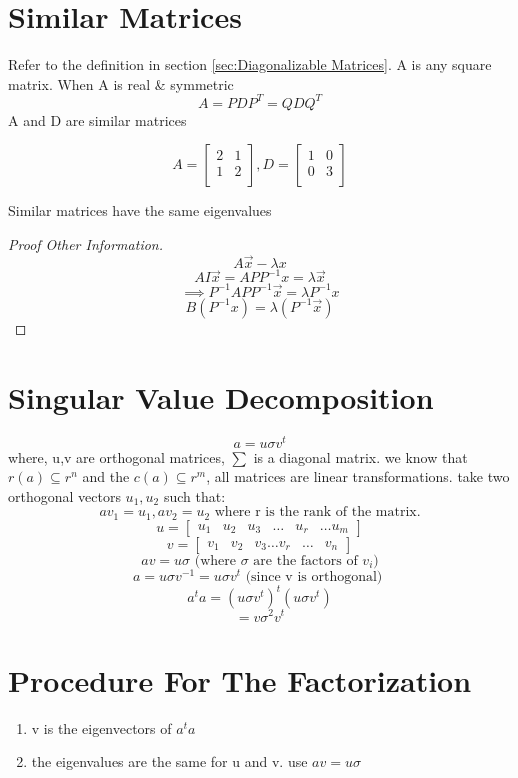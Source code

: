 \documentclass[twoside]{report}
\begin{document}
\section{Similar Matrices}
Refer to the definition in section \ref{sec:Diagonalizable Matrices}.
A is any square matrix. 
When A is real \& symmetric
\[
	A = PDP^T = QDQ^T
\]
A and D are similar matrices
\begin{example}
	\[
		A = 
		\begin{bmatrix}
		   2 & 1 \\
		   1 & 2 \\
		\end{bmatrix},
		 D = 
		\begin{bmatrix}
		   1 & 0 \\
		   0 & 3 \\
		\end{bmatrix}
	\]
\end{example}
\begin{note}
	Similar matrices have the same eigenvalues
\end{note}
\begin{proof}[Proof Other Information]
   \[
   A\vec{x} - \lambda{x}	
   \]
   \[
      AI\vec{x} = APP^{-1}x = \lambda \vec{x}
   \]
   \[
      \implies P^{-1} A P P^{-1} \vec{x} = \lambda P^{-1} x
   \]
   \[
   	B(P^{-1}x) = \lambda(P^{-1}\vec{x})
   \]
   
\end{proof}
\section{Singular Value Decomposition}
\[
   a = u \sigma v^t
     \]
     where, u,v are orthogonal matrices, $\sum$ is a diagonal matrix.
we know that $r(a) \subseteq r^n$ and the $c(a) \subseteq r^m$, all matrices are linear transformations.
take two orthogonal vectors $u_1, u_2$ such that:
\[
   av_1 = u_1, av_2 = u_2 \text{ where r is the rank of the matrix.}
\]
\[
   u = 
   \begin{bmatrix}
      u_1 & u_2 & u_3 &  \dots & u_r & \dots u_m
   \end{bmatrix}
\]
\[
	v = 
	\begin{bmatrix}
	   v_1 & v_2 & v_3 \dots v_r & \dots & v_n
	\end{bmatrix}
\]
\[
   av = u \sigma \text{ (where $\sigma$ are the factors of $v_i$)}
\]
\[
   a = u \sigma v^{-1} = u\sigma v^t \text{ (since v is orthogonal) }
\]
\[
   a^{t}a = (u\sigma v^t)^t(u \sigma v^t)
\]
\[
	= v \sigma^2 v^t
\]
\section{Procedure For The Factorization}
\begin{enumerate}
	\item v is the eigenvectors of $a^ta$
	\item the eigenvalues are the same for u and v.
	use $av = u \sigma$ 
\end{enumerate}
\end{document}
